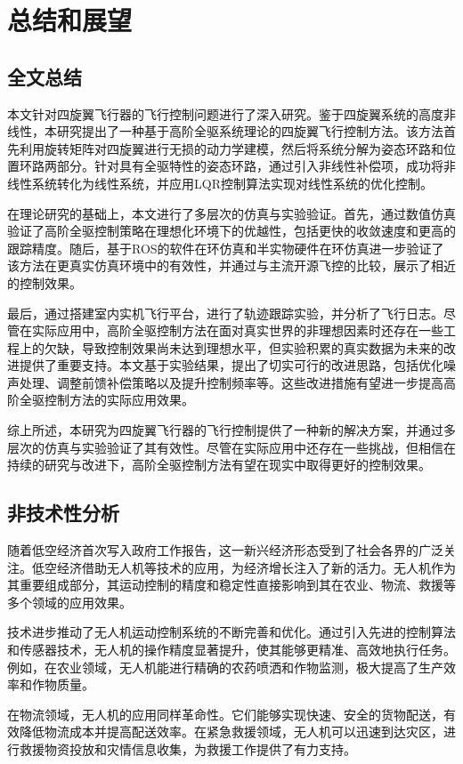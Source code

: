 
\chapter{总结和展望}
\section{全文总结}
本文针对四旋翼飞行器的飞行控制问题进行了深入研究。鉴于四旋翼系统的高度非线性，本研究提出了一种基于高阶全驱系统理论的四旋翼飞行控制方法。该方法首先利用旋转矩阵对四旋翼进行无损的动力学建模，然后将系统分解为姿态环路和位置环路两部分。针对具有全驱特性的姿态环路，通过引入非线性补偿项，成功将非线性系统转化为线性系统，并应用LQR控制算法实现对线性系统的优化控制。

在理论研究的基础上，本文进行了多层次的仿真与实验验证。首先，通过数值仿真验证了高阶全驱控制策略在理想化环境下的优越性，包括更快的收敛速度和更高的跟踪精度。随后，基于ROS的软件在环仿真和半实物硬件在环仿真进一步验证了该方法在更真实仿真环境中的有效性，并通过与主流开源飞控的比较，展示了相近的控制效果。

最后，通过搭建室内实机飞行平台，进行了轨迹跟踪实验，并分析了飞行日志。尽管在实际应用中，高阶全驱控制方法在面对真实世界的非理想因素时还存在一些工程上的欠缺，导致控制效果尚未达到理想水平，但实验积累的真实数据为未来的改进提供了重要支持。本文基于实验结果，提出了切实可行的改进思路，包括优化噪声处理、调整前馈补偿策略以及提升控制频率等。这些改进措施有望进一步提高高阶全驱控制方法的实际应用效果。

综上所述，本研究为四旋翼飞行器的飞行控制提供了一种新的解决方案，并通过多层次的仿真与实验验证了其有效性。尽管在实际应用中还存在一些挑战，但相信在持续的研究与改进下，高阶全驱控制方法有望在现实中取得更好的控制效果。
\section{非技术性分析}
随着低空经济首次写入政府工作报告，这一新兴经济形态受到了社会各界的广泛关注。低空经济借助无人机等技术的应用，为经济增长注入了新的活力。无人机作为其重要组成部分，其运动控制的精度和稳定性直接影响到其在农业、物流、救援等多个领域的应用效果。

技术进步推动了无人机运动控制系统的不断完善和优化。通过引入先进的控制算法和传感器技术，无人机的操作精度显著提升，使其能够更精准、高效地执行任务。例如，在农业领域，无人机能进行精确的农药喷洒和作物监测，极大提高了生产效率和作物质量。

在物流领域，无人机的应用同样革命性。它们能够实现快速、安全的货物配送，有效降低物流成本并提高配送效率。在紧急救援领域，无人机可以迅速到达灾区，进行救援物资投放和灾情信息收集，为救援工作提供了有力支持。

